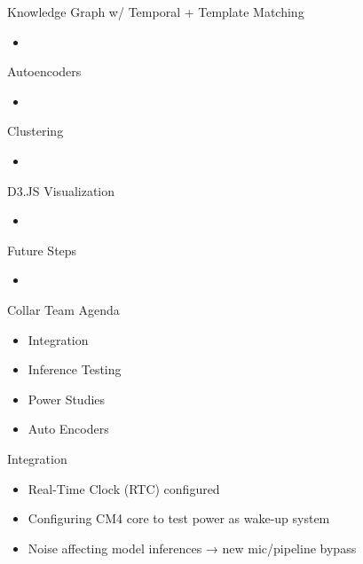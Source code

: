 \begin{frame}{Knowledge Graph w/ Temporal + Template Matching}
    \begin{itemize}
        \item 
    \end{itemize}
\end{frame}

\begin{frame}{Autoencoders}
    \begin{itemize}
        \item 
    \end{itemize}
\end{frame}

\begin{frame}{Clustering}
    \begin{itemize}
        \item 
    \end{itemize}
\end{frame}

\begin{frame}{D3.JS Visualization}
    \begin{itemize}
        \item 
    \end{itemize}
\end{frame}

\begin{frame}{Future Steps}
    \begin{itemize}
        \item 
    \end{itemize}
\end{frame}

\begin{frame}{Collar Team Agenda}
    \begin{itemize}
        \item Integration
        \item Inference Testing
        \item Power Studies
        \item Auto Encoders       
    \end{itemize}
\end{frame}

\begin{frame}{Integration}
    \begin{itemize}
        \item Real-Time Clock (RTC) configured
        \item Configuring CM4 core to test power as wake-up system
        \item Noise affecting model inferences → new mic/pipeline bypass
    \end{itemize}
\end{frame}

